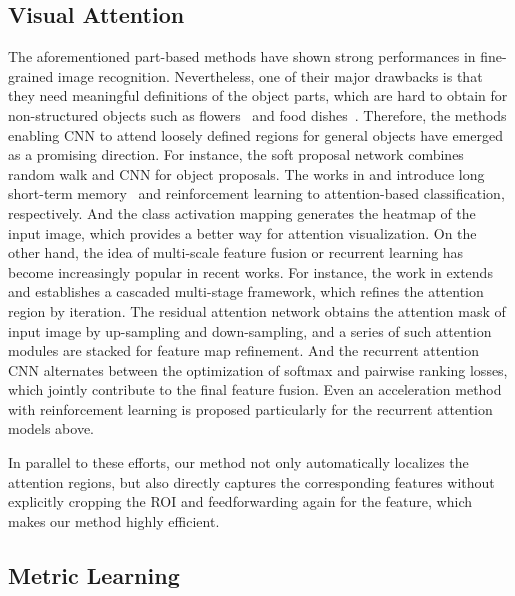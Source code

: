 \documentclass[runningheads]{llncs}
\begin{document}
\subsection{Visual Attention}
The aforementioned part-based methods have shown strong performances in fine-grained image recognition.
Nevertheless, one of their major drawbacks is that they need meaningful definitions of the object parts, which are hard to obtain for non-structured objects such as flowers~\cite{NilsbackZ08} and food dishes~\cite{BossardGG14}.
Therefore, the methods enabling CNN to attend loosely defined regions for general objects have emerged as a promising direction.
For instance, the soft proposal network \cite{zhu2017soft} combines random walk and CNN for object proposals.
The works in \cite{zhao2016diversified} and \cite{liu2016fully} introduce long short-term memory~\cite{hochreiter1997long} and reinforcement learning to attention-based classification, respectively.
And the class activation mapping \cite{zhou2016learning} generates the heatmap of the input image, which provides a better way for attention visualization.
On the other hand, the idea of multi-scale feature fusion or recurrent learning has become increasingly popular in recent works.
For instance, the work in \cite{rosenfeld2016visual} extends \cite{zhou2016learning} and establishes a cascaded multi-stage framework, which refines the attention region by iteration.
The residual attention network \cite{wang2017residual} obtains the attention mask of input image by up-sampling and down-sampling, and a series of such attention modules are stacked for feature map refinement.
And the recurrent attention CNN \cite{fu2017look} alternates between the optimization of softmax and pairwise ranking losses, which jointly contribute to the final feature fusion.
Even an acceleration method \cite{li2017dynamic} with reinforcement learning is proposed particularly for the recurrent attention models above.

In parallel to these efforts, our method not only automatically localizes the attention regions, but also directly captures the corresponding features without explicitly cropping the ROI and feedforwarding again for the feature, which makes our method highly efficient.

\vspace{-.1in}
\subsection{Metric Learning}
\end{document}
